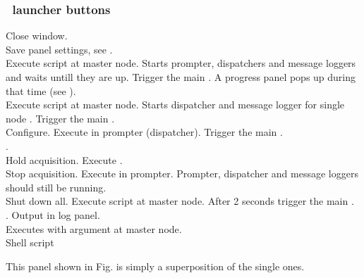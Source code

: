 {\subsubsection{\mbs\ launcher buttons}
 Close window.\\
 Save panel settings, see .\\
  Execute script  at master node.
Starts prompter, dispatchers and message loggers and waits untill they are up.
Trigger the main .
A progress panel pops up during that time (see ).\\
 Execute script  at master node.
Starts dispatcher and message logger for single node \mbs.
Trigger the main .\\
 Configure. Execute  in prompter (dispatcher).
Trigger the main .\\
 .\\
 Hold acquisition. Execute .\\
 Stop acquisition. Execute  in prompter.
Prompter, dispatcher and message loggers should still be running.\\
 Shut down all. Execute script  at master node.
After 2 seconds trigger the main .\\
 . Output in log panel.\\
 Executes  with argument  at master node.\\
 Shell script

This panel shown in Fig. \pageref{user-gui-pan-dabcmbs} is simply a superposition of the single ones.
}
